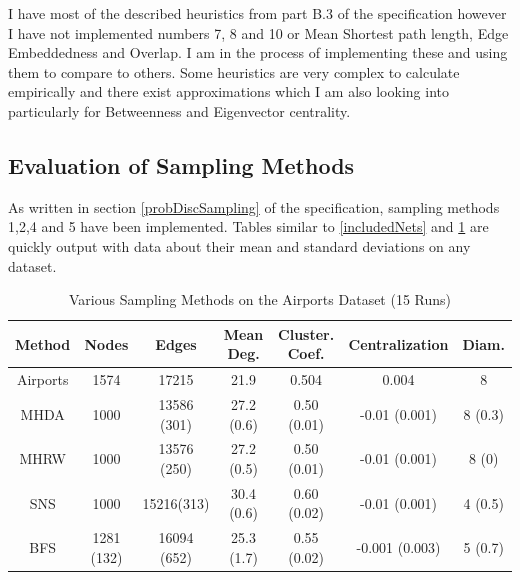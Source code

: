 \documentclass{article}
\begin{document}
I have most of the described heuristics from part B.3 of the specification however I have not implemented numbers 7, 8 and 10 or Mean Shortest path length, Edge Embeddedness and Overlap.
I am in the process of implementing these and using them to compare to others.
Some heuristics are very complex to calculate empirically and there exist approximations which I am also looking into particularly for Betweenness and Eigenvector centrality.

\subsection{Evaluation of Sampling Methods}

As written in section \ref{probDiscSampling} of the specification, sampling methods 1,2,4 and 5 have been implemented.
Tables similar to \ref{includedNets} and \ref{enron_sample_methods_compared} are quickly output with data about their mean and standard deviations on any dataset.

\begin{table}[h]
	\centering
	\begin{tabular}{|c|c|c|c|c|c|c|}
		\hline
		\textbf{Method} & \textbf{Nodes} & \textbf{Edges} & \textbf{Mean Deg.} & \textbf{Cluster. Coef.} & \textbf{Centralization} & \textbf{Diam.} \\
		\hline
		Airports        & 1574           & 17215          & 21.9               & 0.504                   & 0.004                   & 8              \\
		\hline
		MHDA            & 1000           & 13586	 (301)   & 27.2 (0.6)         & 0.50 (0.01)             & -0.01 (0.001)           & 8 (0.3)        \\
		\hline
		MHRW            & 1000           & 13576 (250)    & 27.2 (0.5)         & 0.50	(0.01)             & -0.01  (0.001)          & 8 (0)          \\
		\hline
		SNS             & 1000           & 15216(313)     & 30.4 (0.6)         & 0.60 (0.02)             & -0.01 (0.001)           & 4 (0.5)        \\
		\hline
		BFS             & 1281 (132)     & 16094  (652)   & 25.3 (1.7)         & 0.55	(0.02)             & -0.001	(0.003)          & 5	(0.7)        \\
		\hline
	\end{tabular}
	\caption{Various Sampling Methods on the Airports Dataset (15 Runs)}
	\label{enron_sample_methods_compared}
\end{table}
\end{document}
